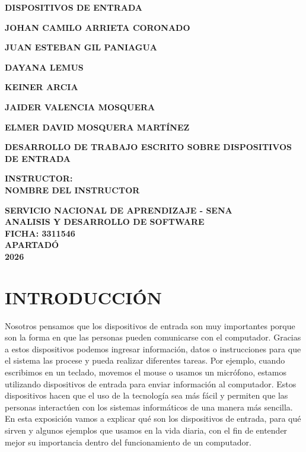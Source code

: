 \documentclass[12pt, letterpaper]{article}
\begin{document}
\begin{titlepage}
    \centering
    {\Large \textbf{DISPOSITIVOS DE ENTRADA}} \par
    \vspace{4cm}

    \textbf{JOHAN CAMILO ARRIETA CORONADO} \par
    \textbf{JUAN ESTEBAN GIL PANIAGUA} \par
    \textbf{DAYANA LEMUS} \par
    \textbf{KEINER ARCIA} \par
    \textbf{JAIDER VALENCIA MOSQUERA} \par
    \textbf{ELMER DAVID MOSQUERA MARTÍNEZ} \par

    \vspace{3cm}

    \textbf{DESARROLLO DE TRABAJO ESCRITO SOBRE DISPOSITIVOS DE ENTRADA} \par
    \vspace{2.5cm}

    \textbf{INSTRUCTOR:} \\
    \textbf{NOMBRE DEL INSTRUCTOR} \par

    \vfill

    \textbf{SERVICIO NACIONAL DE APRENDIZAJE - SENA} \\
    \textbf{ANALISIS Y DESARROLLO DE SOFTWARE} \\
    \textbf{FICHA: 3311546} \\
    \textbf{APARTADÓ} \\
    \textbf{2026}
\end{titlepage}

\newpage
\setcounter{page}{2}
\tableofcontents
\newpage
\listoffigures
\newpage
\listoftables
\newpage

\section{INTRODUCCIÓN}

Nosotros pensamos que los dispositivos de entrada son muy importantes porque son la forma en que las personas pueden comunicarse con el computador. Gracias a estos dispositivos podemos ingresar información, datos o instrucciones para que el sistema las procese y pueda realizar diferentes tareas.
Por ejemplo, cuando escribimos en un teclado, movemos el mouse o usamos un micrófono, estamos utilizando dispositivos de entrada para enviar información al computador. Estos dispositivos hacen que el uso de la tecnología sea más fácil y permiten que las personas interactúen con los sistemas informáticos de una manera más sencilla.
En esta exposición vamos a explicar qué son los dispositivos de entrada, para qué sirven y algunos ejemplos que usamos en la vida diaria, con el fin de entender mejor su importancia dentro del funcionamiento de un computador.
\end{document}
